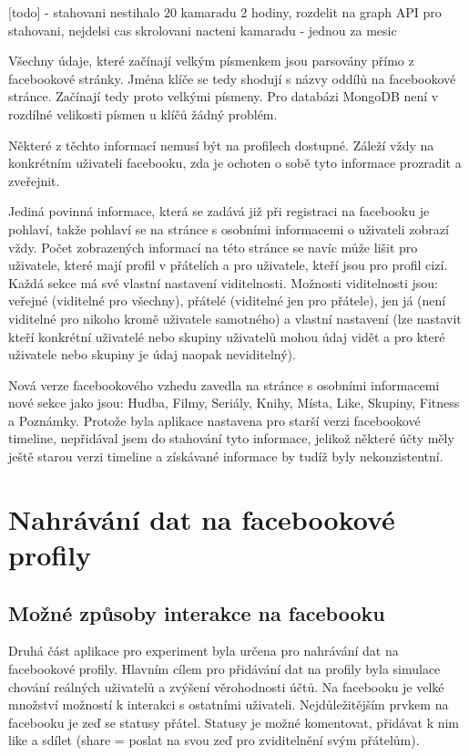 \documentclass[thesis=M,czech]{FITthesis}[2013/05/10]
\begin{document}
[todo] - stahovani nestihalo 20 kamaradu 2 hodiny, rozdelit na graph API pro stahovani, nejdelsi cas skrolovani nacteni kamaradu - jednou za mesic


Všechny údaje, které začínají velkým písmenkem jsou parsovány přímo z facebookové stránky. Jména klíče se tedy shodují s názvy oddílů na facebookové stránce. Začínají tedy proto velkými písmeny. Pro databázi MongoDB není v rozdílné velikosti písmen u klíčů žádný problém.

Některé z těchto informací nemusí být na profilech dostupné. Záleží vždy na konkrétním uživateli facebooku, zda je ochoten o sobě tyto informace prozradit a zveřejnit.

Jediná povinná informace, která se zadává již při registraci na facebooku je pohlaví, takže pohlaví se na stránce s osobními informacemi o uživateli zobrazí vždy. Počet zobrazených informací na této stránce se navíc může lišit pro uživatele, které mají profil v přátelích a pro uživatele, kteří jsou pro profil cizí. Každá sekce má své vlastní nastavení viditelnosti. Možnosti viditelnosti jsou: veřejné (viditelné pro všechny), přátelé (viditelné jen pro přátele), jen já (není viditelné pro nikoho kromě uživatele samotného) a vlastní nastavení (lze nastavit kteří konkrétní uživatelé nebo skupiny uživatelů mohou údaj vidět a pro které uživatele nebo skupiny je údaj naopak neviditelný).

Nová verze facebookového vzhedu zavedla na stránce s osobními informacemi nové sekce jako jsou: Hudba, Filmy, Seriály, Knihy, Místa, Like, Skupiny, Fitness a Poznámky. Protože byla aplikace nastavena pro starší verzi facebookové timeline, nepřidával jsem do stahování tyto informace, jelikož některé účty měly ještě starou verzi timeline a získávané informace by tudíž byly nekonzistentní.

\section{Nahrávání dat na facebookové profily}

\subsection{Možné způsoby interakce na facebooku}

Druhá část aplikace pro experiment byla určena pro nahrávání dat na facebookové profily. Hlavním cílem pro přidávání dat na profily byla simulace chování reálných uživatelů a zvýšení věrohodnosti účtů. Na facebooku je velké množství možností k interakci s ostatními uživateli. Nejdůležitějším prvkem na facebooku je zeď se statusy přátel. Statusy je možné komentovat, přidávat k nim like a sdílet (share = poslat na svou zeď pro zviditelnění svým přátelům). 
\end{document}
